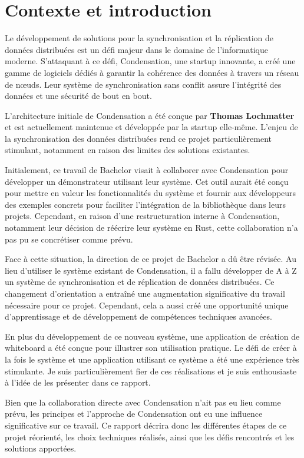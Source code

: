 \section{Contexte et introduction}

Le développement de solutions pour la synchronisation et la réplication de données distribuées est un défi majeur dans le domaine de l'informatique moderne. S'attaquant à ce défi, Condensation, une startup innovante, a créé une gamme de logiciels dédiés à garantir la cohérence des données à travers un réseau de n\oe{}uds. Leur système de synchronisation sans conflit assure l'intégrité des données et une sécurité de bout en bout.

L'architecture initiale de Condensation a été conçue par \textbf{Thomas Lochmatter} et est actuellement maintenue et développée par la startup elle-même. L'enjeu de la synchronisation des données distribuées rend ce projet particulièrement stimulant, notamment en raison des limites des solutions existantes.

Initialement, ce travail de Bachelor visait à collaborer avec Condensation pour développer un démonstrateur utilisant leur système. Cet outil aurait été conçu pour mettre en valeur les fonctionnalités du système et fournir aux développeurs des exemples concrets pour faciliter l'intégration de la bibliothèque dans leurs projets. Cependant, en raison d'une restructuration interne à Condensation, notamment leur décision de réécrire leur système en Rust, cette collaboration n'a pas pu se concrétiser comme prévu.

Face à cette situation, la direction de ce projet de Bachelor a dû être révisée. Au lieu d'utiliser le système existant de Condensation, il a fallu développer de A à Z un système de synchronisation et de réplication de données distribuées. Ce changement d'orientation a entraîné une augmentation significative du travail nécessaire pour ce projet. Cependant, cela a aussi créé une opportunité unique d'apprentissage et de développement de compétences techniques avancées.

En plus du développement de ce nouveau système, une application de création de whiteboard a été conçue pour illustrer son utilisation pratique. Le défi de créer à la fois le système et une application utilisant ce système a été une expérience très stimulante. Je suis particulièrement fier de ces réalisations et je suis enthousiaste à l'idée de les présenter dans ce rapport.

Bien que la collaboration directe avec Condensation n'ait pas eu lieu comme prévu, les principes et l'approche de Condensation ont eu une influence significative sur ce travail. Ce rapport décrira donc les différentes étapes de ce projet réorienté, les choix techniques réalisés, ainsi que les défis rencontrés et les solutions apportées.